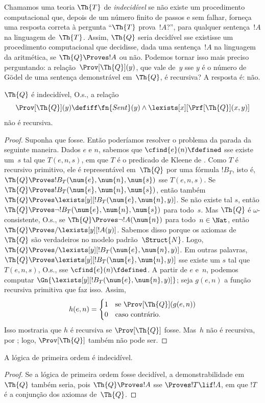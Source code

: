 \documentclass[../../../include/open-logic-section]{subfiles}
\begin{document}

Chamamos uma teoria $\Th{T}$ de \emph{indecidível} se não existe um
procedimento computacional que, depois de um número finito de passos e
sem falhar, forneça uma resposta correta à pergunta ``$\Th{T}$
prova~$!A$?'', para qualquer sentença~$!A$ na linguagem de~$\Th{T}$.
Assim, $\Th{Q}$ seria decidível sse existisse um procedimento
computacional que decidisse, dada uma sentença~$!A$ na linguagem da
aritmética, se $\Th{Q} \Proves !A$ ou não. Podemos tornar isso mais
preciso perguntando: a relação~$\Prov[\Th{Q}](y)$, que vale de~$y$ sse
$y$ é o número de G\"odel de uma sentença demonstrável em~$\Th{Q}$, é
recursiva? A resposta é: não.

\begin{thm}
$\Th{Q}$ é indecidível, O.s.\@, a relação
\[
\Prov[\Th{Q}](y) \defiff \fn{Sent}(y) \land
\lexists[x][\Prf[\Th{Q}](x, y)]
\]
não é recursiva.
\end{thm}

\begin{proof}
Suponha que fosse. Então poderíamos resolver o problema da parada da
seguinte maneira. Dados $e$ e $n$, sabemos que
$\cfind{e}(n) \fdefined$ sse existe um~$s$ tal que $T(e, n, s)$, em que
$T$ é o predicado de Kleene de
. Como $T$ é recursivo primitivo,
ele é representável em~$\Th{Q}$ por uma fórmula $!B_T$, isto é,
$\Th{Q} \Proves !B_T(\num{e}, \num{n}, \num{s})$ sse $T(e, n, s)$.
Se $\Th{Q} \Proves !B_T(\num{e}, \num{n}, \num{s})$, então também
$ \Th{Q} \Proves \lexists[y][!B_T(\num{e}, \num{n}, y)]$. Se não
existe tal $s$, então $\Th{Q} \Proves \lnot
!B_T(\num{e}, \num{n}, \num{s})$ para todo~$s$. Mas $\Th{Q}$ é
$\omega$-consistente, O.s.\@, se
$\Th{Q} \Proves \lnot !A(\num{n})$ para todo~$n \in \Nat$, então
$\Th{Q} \Proves/ \lexists[y][!A(y)]$. Sabemos disso porque os axiomas
de $\Th{Q}$ são verdadeiros no modelo padrão~$\Struct{N}$. Logo,
$\Th{Q} \Proves/ \lexists[y][!B_T(\num{e}, \num{n}, y)]$. Em outras
palavras, $\Th{Q} \Proves \lexists[y][!B_T(\num{e}, \num{n}, y)]$ sse
existe um $s$ tal que $T(e, n, s)$, O.s.\@, sse
$\cfind{e}(n) \fdefined$. A partir de $e$ e~$n$, podemos computar
$\Gn{\lexists[y][!B_T(\num{e}, \num{n}, y)]}$; seja $g(e, n)$ a função
recursiva primitiva que faz isso. Assim,
\[
h(e, n) =
\begin{cases}
1 & \text{se $\Prov[\Th{Q}](g(e, n))$}\\
0 & \text{caso contrário}.
\end{cases}
\]
Isso mostraria que $h$ é recursiva se $\Prov[\Th{Q}]$ fosse. Mas~$h$
não é recursiva, por ; logo,
$\Prov[\Th{Q}]$ também não pode ser.
\end{proof}

\begin{cor}
A lógica de primeira ordem é indecidível.
\end{cor}

\begin{proof}
Se a lógica de primeira ordem fosse decidível, a demonstrabilidade
em~$\Th{Q}$ também seria, pois $\Th{Q} \Proves !A$ sse
$\Proves !T \lif !A$, em que $!T$ é a conjunção dos axiomas de~$\Th{Q}$.
\end{proof}
\end{document}
